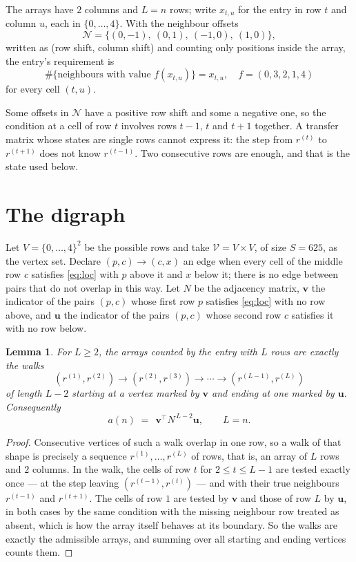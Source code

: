 \documentclass[11pt,a4paper]{article}
\theoremstyle{plain}
\newtheorem{lemma}[theorem]{Lemma}
\theoremstyle{definition}
\begin{document}
The arrays have $2$ columns and $L=n$ rows; write $x_{t,u}$ for the entry in
row $t$ and column $u$, each in $\{0,\dots,4\}$. With the neighbour offsets
\[
\mathcal N=\{(0,-1),\ (0,1),\ (-1,0),\ (1,0)\},
\]
written as (row shift, column shift) and counting only positions inside the array, the
entry's requirement is
\begin{equation}\label{eq:loc}
\#\{\text{neighbours with value }f(x_{t,u})\}=x_{t,u},\quad f=(0,3,2,1,4)
\end{equation}
for every cell $(t,u)$.

Some offsets in $\mathcal N$ have a positive row shift and some a negative one, so the
condition at a cell of row $t$ involves rows $t-1$, $t$ and $t+1$ together. A transfer
matrix whose states are single rows cannot express it: the step from $r^{(t)}$ to
$r^{(t+1)}$ does not know $r^{(t-1)}$. Two consecutive rows are enough, and that is
the state used below.

\section{The digraph}

Let $V=\{0,\dots,4\}^{2}$ be the possible rows and take
$\mathcal V=V\times V$, of size $S=625$, as the vertex set. Declare $(p,c)\to(c,x)$ an edge
when every cell of the middle row $c$ satisfies \eqref{eq:loc} with $p$ above it and $x$
below it; there is no edge between pairs that do not overlap in this way. Let $N$ be the
adjacency matrix, $\mathbf{v}$ the indicator of the pairs $(p,c)$ whose first row $p$
satisfies \eqref{eq:loc} with no row above, and $\mathbf{u}$ the indicator of
the pairs $(p,c)$ whose second row $c$ satisfies it with no row below.

\begin{lemma}\label{lem:walk}
For $L\ge2$, the arrays counted by the entry with $L$ rows are exactly the walks
\[
(r^{(1)},r^{(2)})\to(r^{(2)},r^{(3)})\to\cdots\to(r^{(L-1)},r^{(L)})
\]
of length $L-2$ starting at a vertex marked by $\mathbf{v}$ and ending at one marked by
$\mathbf{u}$. Consequently
\[
a(n)\;=\;\,\mathbf{v}^{\!\top}N^{\,L-2}\mathbf{u},\qquad L=n .
\]
\end{lemma}

\begin{proof}
Consecutive vertices of such a walk overlap in one row, so a walk of that shape is
precisely a sequence $r^{(1)},\dots,r^{(L)}$ of rows, that is, an array of $L$ rows
and $2$ columns. In the walk, the cells of row $t$ for $2\le t\le L-1$ are tested
exactly once --- at the step leaving $(r^{(t-1)},r^{(t)})$ --- and with their true
neighbours $r^{(t-1)}$ and $r^{(t+1)}$. The cells of row $1$ are tested by
$\mathbf{v}$ and those of row $L$ by $\mathbf{u}$, in both cases by the same condition
with the missing neighbour row treated as absent, which is how the array itself behaves at
its boundary. So the walks are exactly the admissible arrays, and summing over all starting
and ending vertices counts them.
\end{proof}
\end{document}
